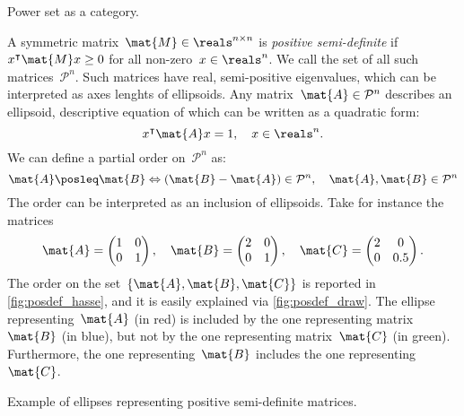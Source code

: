 \begin{marginfigure}
    \centering
    \caption{Power set as a category.}
    \label{fig:powersetcat}
\end{marginfigure}

\begin{example}
    A symmetric matrix~$\mat{M}\in \reals^{n\times n}$ is \emph{positive semi-definite} if~$x^\intercal \mat{M}x\geq 0$ for all non-zero~$x\in \reals^n$.
    We call the set of all such matrices~$\mathcal{P}^n$.
    Such matrices have real, semi-positive eigenvalues, which can be interpreted as axes lenghts of ellipsoids.
    Any matrix~$\mat{A}\in \mathcal{P}^n$ describes an ellipsoid, descriptive equation of which can be written as a quadratic form:
    \begin{equation*}
        x^\intercal \mat{A}x=1,\quad x\in \reals^n.
    \end{equation*}
    We can define a partial order on~$\mathcal{P}^n$ as:
    \begin{equation*}
        \mat{A}\posleq \mat{B} \Leftrightarrow (\mat{B}-\mat{A})\in \mathcal{P}^n, \quad \mat{A},\mat{B}\in \mathcal{P}^n
    \end{equation*}
    The order can be interpreted as an inclusion of ellipsoids.
    Take for instance the matrices
    \begin{equation*}
        \mat{A}=\begin{pmatrix}
            1 & 0 \\0& 1
        \end{pmatrix}, \quad \mat{B}=\begin{pmatrix}
            2 & 0 \\0& 1
        \end{pmatrix},\quad \mat{C}=\begin{pmatrix}
            2 & 0 \\0& 0.5
        \end{pmatrix}.
    \end{equation*}
    The order on the set~$\{\mat{A},\mat{B},\mat{C}\}$ is reported in \cref{fig:posdef_hasse}, and it is easily explained via \cref{fig:posdef_draw}.
    The ellipse representing~$\mat{A}$ (in red) is included by the one representing matrix~$\mat{B}$ (in blue), but not by the one representing matrix~$\mat{C}$ (in green).
    Furthermore, the one representing~$\mat{B}$ includes the one representing~$\mat{C}$.
\end{example}

\begin{marginfigure}
    \centering
    \caption{Example of ellipses representing positive semi-definite matrices.}
    \label{fig:posdef_draw}
\end{marginfigure}

